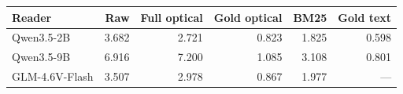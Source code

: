 \begin{tabular}{lrrrrr}
\toprule
Reader & Raw & Full optical & Gold optical & BM25 & Gold text \\
\midrule
Qwen3.5-2B & 3.682 & 2.721 & 0.823 & 1.825 & 0.598 \\
Qwen3.5-9B & 6.916 & 7.200 & 1.085 & 3.108 & 0.801 \\
GLM-4.6V-Flash & 3.507 & 2.978 & 0.867 & 1.977 & --- \\
\bottomrule
\end{tabular}
